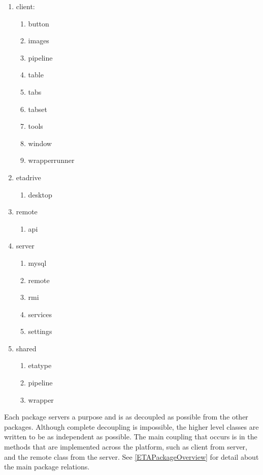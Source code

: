 \documentclass[a4paper,12pt]{texMemo}
\begin{document}
\begin{enumerate}
    \item client:
    \begin{enumerate}
        \item button
        \item images
        \item pipeline
        \item table
        \item tabs
        \item tabset
        \item tools
        \item window
        \item wrapperrunner
    \end{enumerate}
    \item etadrive
    \begin{enumerate}
        \item desktop
    \end{enumerate}
    \item remote
    \begin{enumerate}
        \item api
    \end{enumerate}
    \item server
    \begin{enumerate}
        \item mysql
        \item remote
        \item rmi
        \item services
        \item settings
    \end{enumerate}
    \item shared
    \begin{enumerate}
        \item etatype
        \item pipeline
        \item wrapper
    \end{enumerate}
\end{enumerate}

Each package servers a purpose and is as decoupled as possible from the other packages. Although complete decoupling is impossible, the higher level classes are written to be as independent as possible. The main coupling that occurs is in the methods that are implemented across the platform, such as client from server, and the remote class from the server. See  \ref{ETAPackageOverview} for detail about the main package relations. 
\end{document}
